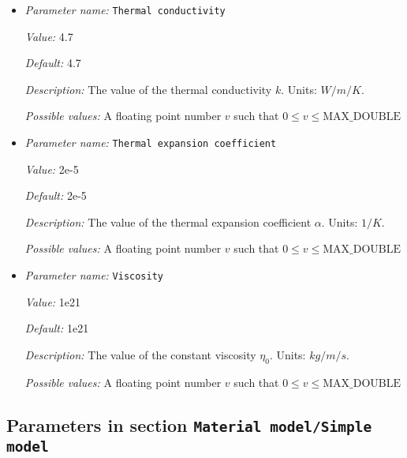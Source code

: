 \begin{itemize}
{\it Possible values:} A floating point number $v$ such that $0 \leq v \leq \text{MAX\_DOUBLE}$
\item {\it Parameter name:} {\tt Thermal conductivity}
\label{parameters:Material model/Simple compressible model/Thermal conductivity}
\label{parameters:Material_20model/Simple_20compressible_20model/Thermal_20conductivity}


{\it Value:} 4.7


{\it Default:} 4.7


{\it Description:} The value of the thermal conductivity $k$. Units: $W/m/K$.


{\it Possible values:} A floating point number $v$ such that $0 \leq v \leq \text{MAX\_DOUBLE}$
\item {\it Parameter name:} {\tt Thermal expansion coefficient}
\label{parameters:Material model/Simple compressible model/Thermal expansion coefficient}
\label{parameters:Material_20model/Simple_20compressible_20model/Thermal_20expansion_20coefficient}


{\it Value:} 2e-5


{\it Default:} 2e-5


{\it Description:} The value of the thermal expansion coefficient $\alpha$. Units: $1/K$.


{\it Possible values:} A floating point number $v$ such that $0 \leq v \leq \text{MAX\_DOUBLE}$
\item {\it Parameter name:} {\tt Viscosity}
\label{parameters:Material model/Simple compressible model/Viscosity}
\label{parameters:Material_20model/Simple_20compressible_20model/Viscosity}


{\it Value:} 1e21


{\it Default:} 1e21


{\it Description:} The value of the constant viscosity $\eta_0$. Units: $kg/m/s$.


{\it Possible values:} A floating point number $v$ such that $0 \leq v \leq \text{MAX\_DOUBLE}$
\end{itemize}

\subsection{Parameters in section \tt Material model/Simple model}
\label{parameters:Material_20model/Simple_20model}

